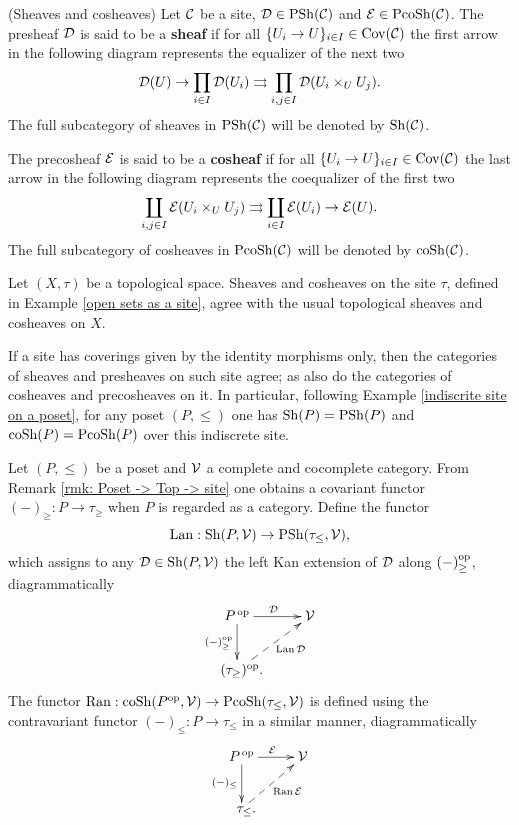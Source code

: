 \documentclass[main.tex]{subfiles}
\begin{document}
\begin{defn}(Sheaves and cosheaves)
Let $\operatorname{\mathcal{C}}$ be a site, $\operatorname{\mathcal{D}}\in\operatorname{PSh}(\operatorname{\mathcal{C}})$ and $\operatorname{\mathcal{E}}\in\operatorname{PcoSh}(\operatorname{\mathcal{C}})$. The presheaf $\operatorname{\mathcal{D}}$ is said to be a \textbf{sheaf} if for all $\{U_i\to U\}_{i\in I}\in\operatorname{Cov}(\operatorname{\mathcal{C}})$ the first arrow in the following diagram represents the equalizer of the next two $$\operatorname{\mathcal{D}}(U)\to\prod_{i\in I}\operatorname{\mathcal{D}}(U_i)\rightrightarrows\prod_{i,j\in I}\operatorname{\mathcal{D}}(U_i\times_U U_j).$$ The full subcategory of sheaves in $\operatorname{PSh}(\operatorname{\mathcal{C}})$ will be denoted by $\operatorname{Sh}(\operatorname{\mathcal{C}})$.\par

The precosheaf $\operatorname{\mathcal{E}}$ is said to be a \textbf{cosheaf} if for all $\{U_i\to U\}_{i\in I}\in\operatorname{Cov}(\operatorname{\mathcal{C}})$ the last arrow in the following diagram represents the coequalizer of the first two $$\coprod_{i,j\in I}\operatorname{\mathcal{E}}(U_i\times_U U_j)\rightrightarrows\coprod_{i\in I}\operatorname{\mathcal{E}}(U_i)\to\operatorname{\mathcal{E}}(U).$$
The full subcategory of cosheaves in $\operatorname{PcoSh}(\operatorname{\mathcal{C}})$ will be denoted by $\operatorname{coSh}(\operatorname{\mathcal{C}})$.
\end{defn}

\begin{ex}
Let $(X,\tau)$ be a topological space. Sheaves and cosheaves on the site $\tau$, defined in Example \ref{open sets as a site}, agree with the usual topological sheaves and cosheaves on $X$.
\end{ex}

\begin{ex}
If a site has coverings given by the identity morphisms only, then the categories of sheaves and presheaves on such site agree; as also do the categories of cosheaves and precosheaves on it. In particular, following Example \ref{indiscrite site on a poset}, for any poset $(P,\leq)$ one has $\operatorname{Sh}(P)=\operatorname{PSh}(P)$ and $\operatorname{coSh}(P)=\operatorname{PcoSh}(P)$ over this indiscrete site.
\end{ex}

\begin{defn}
Let $(P,\leq)$ be a poset and $\operatorname{\mathcal{V}}$ a complete and cocomplete category. From Remark \ref{rmk: Poset -> Top -> site} one obtains a covariant functor $(-)_{\geq}:P\to\tau_\geq$ when $P$ is regarded as a category. Define the functor
$$\operatorname{Lan}:\operatorname{Sh}(P,\operatorname{\mathcal{V}})\to\operatorname{PSh}(\tau_{\leq},\operatorname{\mathcal{V}}),$$
which assigns to any $\operatorname{\mathcal{D}}\in\operatorname{Sh}(P,\operatorname{\mathcal{V}})$ the left Kan extension of $\operatorname{\mathcal{D}}$ along $(-)^{\operatorname{op}}_{\geq}$, diagrammatically
$$\xymatrix{P^{\,\op}\ar[r]^{\D}\ar[d]_{(-)^{\op}_\geq} & \V \\
\ \ (\tau_\geq)^{\op}. \ar@{-->}[ur]_-{\Lan\D} & }$$
The functor $\operatorname{Ran}:\operatorname{coSh}(P^{\operatorname{op}},\operatorname{\mathcal{V}})\to\operatorname{PcoSh}(\tau_{\leq},\operatorname{\mathcal{V}})$ is defined using the contravariant functor $(-)_{\leq}:P\to\tau_\leq$ in a similar manner, diagrammatically
$$\xymatrix{P^{\,\op}\ar[r]^{\E}\ar[d]_{(-)_\leq} & \V \\ \ \ \tau_\leq. \ar@{-->}[ur]_-{\Ran\E} & }$$
\end{defn}
\end{document}
